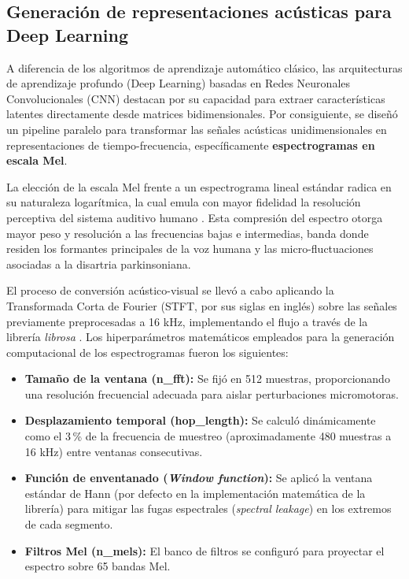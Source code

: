             

        \subsection{Generación de representaciones acústicas para Deep Learning}
        \label{sec:espectrogramas}

        A diferencia de los algoritmos de aprendizaje automático clásico, las arquitecturas de aprendizaje profundo (Deep Learning) basadas en Redes Neuronales Convolucionales (CNN) destacan por su capacidad para extraer características latentes directamente desde matrices bidimensionales. Por consiguiente, se diseñó un pipeline paralelo para transformar las señales acústicas unidimensionales en representaciones de tiempo-frecuencia, específicamente \textbf{espectrogramas en escala Mel}.

        La elección de la escala Mel frente a un espectrograma lineal estándar radica en su naturaleza logarítmica, la cual emula con mayor fidelidad la resolución perceptiva del sistema auditivo humano \cite{stevens1937}. Esta compresión del espectro otorga mayor peso y resolución a las frecuencias bajas e intermedias, banda donde residen los formantes principales de la voz humana y las micro-fluctuaciones asociadas a la disartria parkinsoniana.

        El proceso de conversión acústico-visual se llevó a cabo aplicando la Transformada Corta de Fourier (STFT, por sus siglas en inglés) sobre las señales previamente preprocesadas a 16 kHz, implementando el flujo a través de la librería \textit{librosa} \cite{mcfee2015}. Los hiperparámetros matemáticos empleados para la generación computacional de los espectrogramas fueron los siguientes:

        \begin{itemize}
            \item \textbf{Tamaño de la ventana (n\_fft):} Se fijó en 512 muestras, proporcionando una resolución frecuencial adecuada para aislar perturbaciones micromotoras.
            \item \textbf{Desplazamiento temporal (hop\_length):} Se calculó dinámicamente como el 3\,\% de la frecuencia de muestreo (aproximadamente 480 muestras a 16 kHz) entre ventanas consecutivas.
            \item \textbf{Función de enventanado (\textit{Window function}):} Se aplicó la ventana estándar de Hann (por defecto en la implementación matemática de la librería) para mitigar las fugas espectrales (\textit{spectral leakage}) en los extremos de cada segmento.
            \item \textbf{Filtros Mel (n\_mels):} El banco de filtros se configuró para proyectar el espectro sobre 65 bandas Mel.
        \end{itemize}

